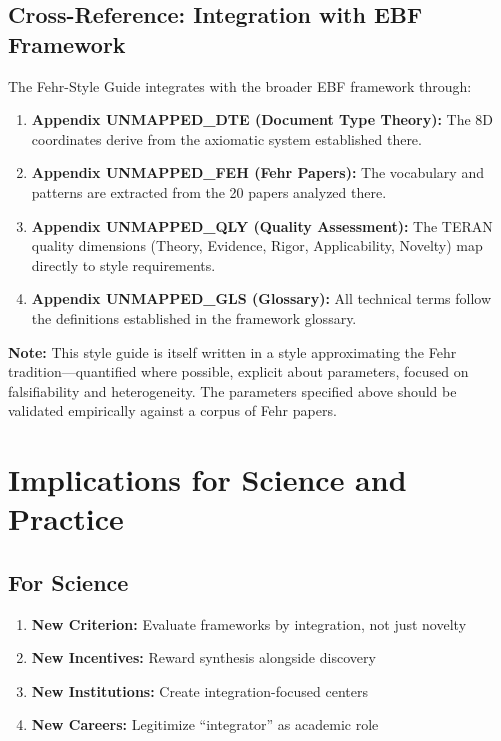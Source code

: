 \subsection{Cross-Reference: Integration with EBF Framework}

The Fehr-Style Guide integrates with the broader EBF framework through:

\begin{enumerate}
\item \textbf{Appendix UNMAPPED_DTE (Document Type Theory):} The 8D coordinates
      derive from the axiomatic system established there.

\item \textbf{Appendix UNMAPPED_FEH (Fehr Papers):} The vocabulary and patterns
      are extracted from the 20 papers analyzed there.

\item \textbf{Appendix UNMAPPED_QLY (Quality Assessment):} The TERAN quality
      dimensions (Theory, Evidence, Rigor, Applicability, Novelty)
      map directly to style requirements.

\item \textbf{Appendix UNMAPPED_GLS (Glossary):} All technical terms follow the
      definitions established in the framework glossary.
\end{enumerate}

\textbf{Note:} This style guide is itself written in a style approximating
the Fehr tradition---quantified where possible, explicit about parameters,
focused on falsifiability and heterogeneity. The parameters specified above
should be validated empirically against a corpus of Fehr papers.



\section{Implications for Science and Practice}
\label{sec:meta-implications}

\subsection{For Science}

\begin{enumerate}
\item \textbf{New Criterion:} Evaluate frameworks by integration, not just novelty
\item \textbf{New Incentives:} Reward synthesis alongside discovery
\item \textbf{New Institutions:} Create integration-focused centers
\item \textbf{New Careers:} Legitimize ``integrator'' as academic role
\end{enumerate}

